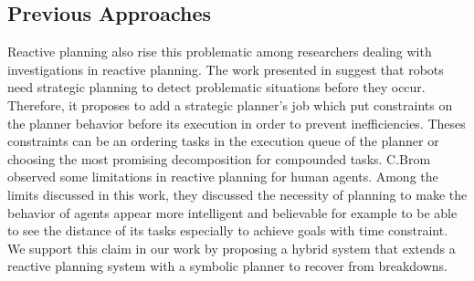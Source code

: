 \documentclass[conference]{IEEEtran}
\begin{document}
	\subsection{Previous Approaches} 
	\par Reactive planning also rise this problematic among researchers dealing with investigations in reactive planning. The work presented in  \cite{firby1987investigation} suggest that robots need strategic planning to detect problematic situations before they occur. Therefore, it proposes to add a strategic planner's job which put constraints on the planner behavior before its execution in order to prevent inefficiencies. Theses constraints can be an ordering tasks in the execution queue of the planner or choosing the most promising decomposition for compounded tasks.
	C.Brom \cite{brom2005hierarchical} observed some limitations in reactive planning for human agents. Among the limits discussed in this work, they discussed the necessity of planning to make the behavior of
	agents appear more intelligent and believable for example to be able to see the distance of its tasks especially to achieve goals with time constraint.    We support this claim in our work  by proposing a hybrid system that extends a reactive planning system with a symbolic planner to recover from breakdowns. 
	
\end{document}
